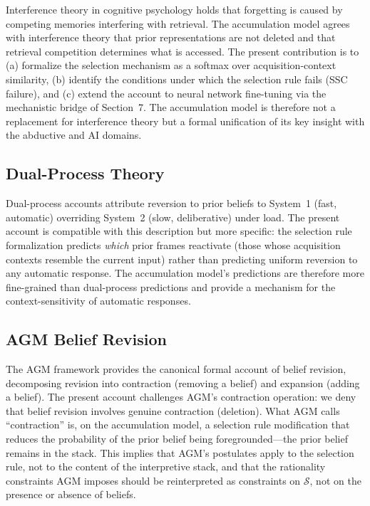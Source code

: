 \documentclass[12pt]{article}
\begin{document}
Interference theory in cognitive psychology
\cite{mccloskey1989catastrophic, anderson1983spreading}
holds that forgetting is caused by competing memories interfering
with retrieval.
The accumulation model agrees with interference theory that prior
representations are not deleted and that retrieval competition
determines what is accessed.
The present contribution is to (a) formalize the selection mechanism
as a softmax over acquisition-context similarity, (b) identify the
conditions under which the selection rule fails (SSC failure),
and (c) extend the account to neural network fine-tuning via the
mechanistic bridge of Section~7.
The accumulation model is therefore not a replacement for
interference theory but a formal unification of its key insight
with the abductive and AI domains.

\subsection{Dual-Process Theory}

Dual-process accounts \cite{kahneman2011thinking} attribute
reversion to prior beliefs to System~1 (fast, automatic)
overriding System~2 (slow, deliberative) under load.
The present account is compatible with this description but
more specific: the selection rule formalization predicts
\emph{which} prior frames reactivate (those whose acquisition
contexts resemble the current input) rather than predicting
uniform reversion to any automatic response.
The accumulation model's predictions are therefore more
fine-grained than dual-process predictions and provide a mechanism
for the context-sensitivity of automatic responses.

\subsection{AGM Belief Revision}

The AGM framework \cite{alchourron1985logic} provides the canonical
formal account of belief revision, decomposing revision into
contraction (removing a belief) and expansion (adding a belief).
The present account challenges AGM's contraction operation:
we deny that belief revision involves genuine contraction (deletion).
What AGM calls ``contraction'' is, on the accumulation model,
a selection rule modification that reduces the probability of
the prior belief being foregrounded---the prior belief remains
in the stack.
This implies that AGM's postulates apply to the
selection rule, not to the content of the interpretive stack,
and that the rationality constraints AGM imposes should be
reinterpreted as constraints on $\mathcal{S}$, not on the
presence or absence of beliefs.
\end{document}
